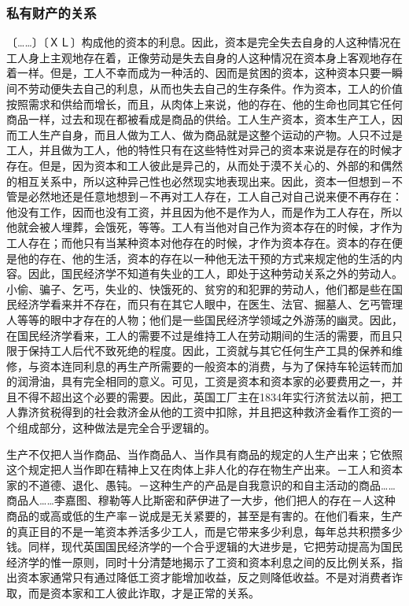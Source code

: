 \documentclass[a4paper,twoside,12pt,AutoFakeBold]{ctexart}
\begin{document}
\subsubsection{私有财产的关系}
〔……〕〔ＸＬ〕构成他的资本的利息。因此，资本是完全失去自身的人这种情况在工人身上主观地存在着，正像劳动是失去自身的人这种情况在资本身上客观地存在着一样。但是，工人不幸而成为一种活的、因而是贫困的资本，这种资本只要一瞬间不劳动便失去自己的利息，从而也失去自己的生存条件。作为资本，工人的价值按照需求和供给而增长，而且，从肉体上来说，他的存在、他的生命也同其它任何商品一样，过去和现在都被看成是商品的供给。工人生产资本，资本生产工人，因而工人生产自身，而且人做为工人、做为商品就是这整个运动的产物。人只不过是工人，并且做为工人，他的特性只有在这些特性对异己的资本来说是存在的时候才存在。但是，因为资本和工人彼此是异己的，从而处于漠不关心的、外部的和偶然的相互关系中，所以这种异己性也必然现实地表现出来。因此，资本一但想到－不管是必然地还是任意地想到－不再对工人存在，工人自己对自己说来便不再存在：他没有工作，因而也没有工资，并且因为他不是作为人，而是作为工人存在，所以他就会被人埋葬，会饿死，等等。工人有当他对自己作为资本存在的时候，才作为工人存在；而他只有当某种资本对他存在的时候，才作为资本存在。资本的存在便是他的存在、他的生活，资本的存在以一种他无法干预的方式来规定他的生活的内容。因此，国民经济学不知道有失业的工人，即处于这种劳动关系之外的劳动人。小偷、骗子、乞丐，失业的、快饿死的、贫穷的和犯罪的劳动人，他们都是些在国民经济学看来并不存在，而只有在其它人眼中，在医生、法官、掘墓人、乞丐管理人等等的眼中才存在的人物；他们是一些国民经济学领域之外游荡的幽灵。因此，在国民经济学看来，工人的需要不过是维持工人在劳动期间的生活的需要，而且只限于保持工人后代不致死绝的程度。因此，工资就与其它任何生产工具的保养和维修，与资本连同利息的再生产所需要的一般资本的消费，与为了保持车轮运转而加的润滑油，具有完全相同的意义。可见，工资是资本和资本家的必要费用之一，并且不得不超出这个必要的需要。因此，英国工厂主在1834年实行济贫法以前，把工人靠济贫税得到的社会救济金从他的工资中扣除，并且把这种救济金看作工资的一个组成部分，这种做法是完全合乎逻辑的。

生产不仅把人当作商品、当作商品人、当作具有商品的规定的人生产出来；它依照这个规定把人当作即在精神上又在肉体上非人化的存在物生产出来。－工人和资本家的不道德、退化、愚钝。－这种生产的产品是自我意识的和自主活动的商品……商品人……李嘉图、穆勒等人比斯密和萨伊进了一大步，他们把人的存在－人这种商品的或高或低的生产率－说成是无关紧要的，甚至是有害的。在他们看来，生产的真正目的不是一笔资本养活多少工人，而是它带来多少利息，每年总共积攒多少钱。同样，现代英国国民经济学的一个合乎逻辑的大进步是，它把劳动提高为国民经济学的惟一原则，同时十分清楚地揭示了工资和资本利息之间的反比例关系，指出资本家通常只有通过降低工资才能增加收益，反之则降低收益。不是对消费者诈取，而是资本家和工人彼此诈取，才是正常的关系。
\end{document}
